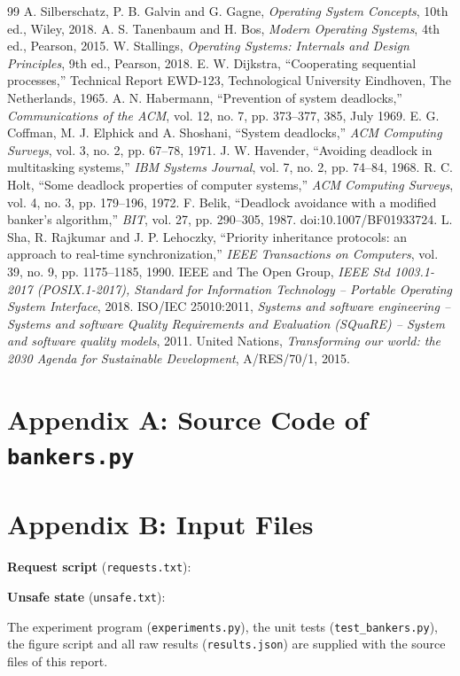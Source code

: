 \documentclass[11pt,a4paper]{report}
\begin{document}
\begin{thebibliography}{99}
 A. Silberschatz, P. B. Galvin and G. Gagne, \textit{Operating System Concepts}, 10th ed., Wiley, 2018.
 A. S. Tanenbaum and H. Bos, \textit{Modern Operating Systems}, 4th ed., Pearson, 2015.
 W. Stallings, \textit{Operating Systems: Internals and Design Principles}, 9th ed., Pearson, 2018.
 E. W. Dijkstra, ``Cooperating sequential processes,'' Technical Report EWD-123, Technological University Eindhoven, The Netherlands, 1965.
 A. N. Habermann, ``Prevention of system deadlocks,'' \textit{Communications of the ACM}, vol. 12, no. 7, pp. 373--377, 385, July 1969.
 E. G. Coffman, M. J. Elphick and A. Shoshani, ``System deadlocks,'' \textit{ACM Computing Surveys}, vol. 3, no. 2, pp. 67--78, 1971.
 J. W. Havender, ``Avoiding deadlock in multitasking systems,'' \textit{IBM Systems Journal}, vol. 7, no. 2, pp. 74--84, 1968.
 R. C. Holt, ``Some deadlock properties of computer systems,'' \textit{ACM Computing Surveys}, vol. 4, no. 3, pp. 179--196, 1972.
 F. Belik, ``Deadlock avoidance with a modified banker's algorithm,'' \textit{BIT}, vol. 27, pp. 290--305, 1987. doi:10.1007/BF01933724.
 L. Sha, R. Rajkumar and J. P. Lehoczky, ``Priority inheritance protocols: an approach to real-time synchronization,'' \textit{IEEE Transactions on Computers}, vol. 39, no. 9, pp. 1175--1185, 1990.
 IEEE and The Open Group, \textit{IEEE Std 1003.1-2017 (POSIX.1-2017), Standard for Information Technology -- Portable Operating System Interface}, 2018.
 ISO/IEC 25010:2011, \textit{Systems and software engineering -- Systems and software Quality Requirements and Evaluation (SQuaRE) -- System and software quality models}, 2011.
 United Nations, \textit{Transforming our world: the 2030 Agenda for Sustainable Development}, A/RES/70/1, 2015.
\end{thebibliography}

\appendix
\chapter*{Appendix A: Source Code of \texttt{bankers.py}}


\chapter*{Appendix B: Input Files}
\noindent\textbf{Request script} (\texttt{requests.txt}):

\noindent\textbf{Unsafe state} (\texttt{unsafe.txt}):

\noindent The experiment program (\texttt{experiments.py}), the unit tests (\texttt{test\_bankers.py}), the figure script and all raw results (\texttt{results.json}) are supplied with the source files of this report.
\end{document}
